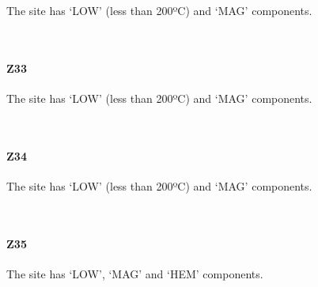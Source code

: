 \documentclass[11pt]{article}
\begin{document}
    The site has `LOW' (less than 200ºC) and `MAG' components.



    \begin{center}
    \end{center}
    { \hspace*{\fill} \\}
    
    \paragraph{Z33}\label{z33}

    The site has `LOW' (less than 200ºC) and `MAG' components.



    \begin{center}
    \end{center}
    { \hspace*{\fill} \\}
    
    \paragraph{Z34}\label{z34}

    The site has `LOW' (less than 200ºC) and `MAG' components.



    \begin{center}
    \end{center}
    { \hspace*{\fill} \\}
    
    \paragraph{Z35}\label{z35}

    The site has `LOW', `MAG' and `HEM' components.



    \begin{center}
    \end{center}
    { \hspace*{\fill} \\}
    
\end{document}
